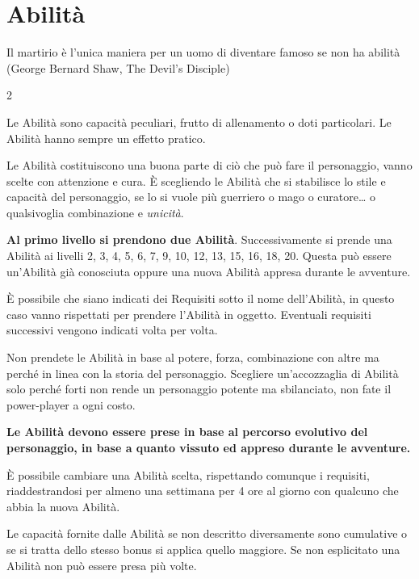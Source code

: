 \section{Abilità}\hypertarget{abilita}{}\label{abilita}

\begin{enfasi}{Il martirio è l'unica maniera per un uomo di diventare famoso se non ha abilità (George Bernard Shaw, The Devil's Disciple)} \end{enfasi}

\begin{multicols}{2}

Le Abilità sono capacità peculiari, frutto di allenamento o doti particolari. Le Abilità hanno sempre un effetto pratico.

Le Abilità costituiscono una buona parte di ciò che può fare il personaggio, vanno scelte con attenzione e cura. È scegliendo le Abilità che si stabilisce lo stile e capacità del personaggio, se lo si vuole più guerriero o mago o curatore… o qualsivoglia combinazione e \emph{unicità}.

\textbf{Al primo livello si prendono due Abilità}. Successivamente si prende una Abilità ai livelli 2, 3, 4, 5, 6, 7, 9, 10, 12, 13, 15, 16, 18, 20. Questa può essere un'Abilità già conosciuta oppure una nuova Abilità appresa durante le avventure.

È possibile che siano indicati dei Requisiti sotto il nome dell'Abilità, in questo caso vanno rispettati per prendere l'Abilità in oggetto.
Eventuali requisiti successivi vengono indicati volta per volta.

Non prendete le Abilità in base al potere, forza, combinazione con altre ma perché in linea con la storia del personaggio.
Scegliere un'accozzaglia di Abilità solo perché forti non rende un personaggio potente ma sbilanciato, non fate il power-player a ogni costo.

\medskip

\textbf{Le Abilità devono essere prese in base al percorso evolutivo del personaggio, in base a quanto vissuto ed appreso durante le avventure.}

\medskip

È possibile cambiare una Abilità scelta, rispettando comunque i requisiti, riaddestrandosi per almeno una settimana per 4 ore al giorno con qualcuno che abbia la nuova Abilità.

Le capacità fornite dalle Abilità se non descritto diversamente sono cumulative o se si tratta dello stesso bonus si applica quello maggiore. Se non esplicitato una Abilità non può essere presa più volte.


\end{multicols}
